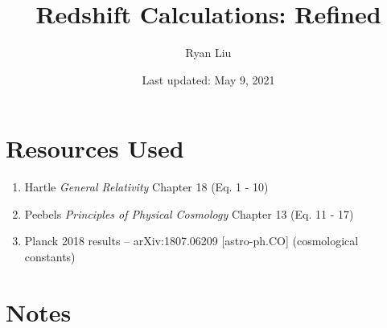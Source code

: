 \documentclass{article}
\title{Redshift Calculations: Refined}
\author{Ryan Liu}
\date{Last updated: May 9, 2021}
\begin{document}
\maketitle

\section{Resources Used}

\begin{enumerate}
    \item Hartle \textit{General Relativity} Chapter 18 (Eq. 1 - 10)
    \item Peebels \textit{Principles of Physical Cosmology} Chapter 13 (Eq. 11 - 17)
    \item Planck 2018 results -- arXiv:1807.06209 [astro-ph.CO] (cosmological constants)
\end{enumerate}

\section{Notes}
\end{document}
